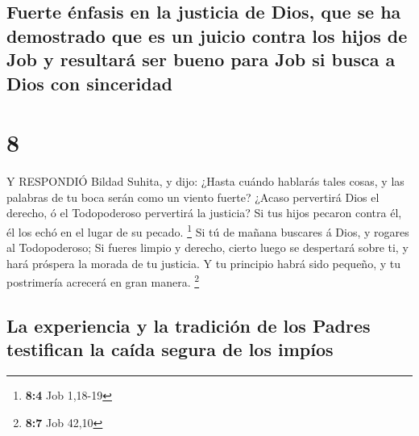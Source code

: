 \hypertarget{fuerte-uxe9nfasis-en-la-justicia-de-dios-que-se-ha-demostrado-que-es-un-juicio-contra-los-hijos-de-job-y-resultaruxe1-ser-bueno-para-job-si-busca-a-dios-con-sinceridad}{%
\subsection{Fuerte énfasis en la justicia de Dios, que se ha demostrado
que es un juicio contra los hijos de Job y resultará ser bueno para Job
si busca a Dios con
sinceridad}\label{fuerte-uxe9nfasis-en-la-justicia-de-dios-que-se-ha-demostrado-que-es-un-juicio-contra-los-hijos-de-job-y-resultaruxe1-ser-bueno-para-job-si-busca-a-dios-con-sinceridad}}

\hypertarget{section-7}{%
\section{8}\label{section-7}}

 Y RESPONDIÓ Bildad Suhita, y dijo:  ¿Hasta
cuándo hablarás tales cosas, y las palabras de tu boca serán como un
viento fuerte?  ¿Acaso pervertirá Dios el derecho, ó el
Todopoderoso pervertirá la justicia?  Si tus hijos pecaron
contra él, él los echó en el lugar de su pecado. \footnote{\textbf{8:4}
  Job 1,18-19}  Si tú de mañana buscares á Dios, y rogares
al Todopoderoso;  Si fueres limpio y derecho, cierto luego
se despertará sobre ti, y hará próspera la morada de tu justicia.
 Y tu principio habrá sido pequeño, y tu postrimería
acrecerá en gran manera. \footnote{\textbf{8:7} Job 42,10}

\hypertarget{la-experiencia-y-la-tradiciuxf3n-de-los-padres-testifican-la-cauxedda-segura-de-los-impuxedos}{%
\subsection{La experiencia y la tradición de los Padres testifican la
caída segura de los
impíos}\label{la-experiencia-y-la-tradiciuxf3n-de-los-padres-testifican-la-cauxedda-segura-de-los-impuxedos}}


